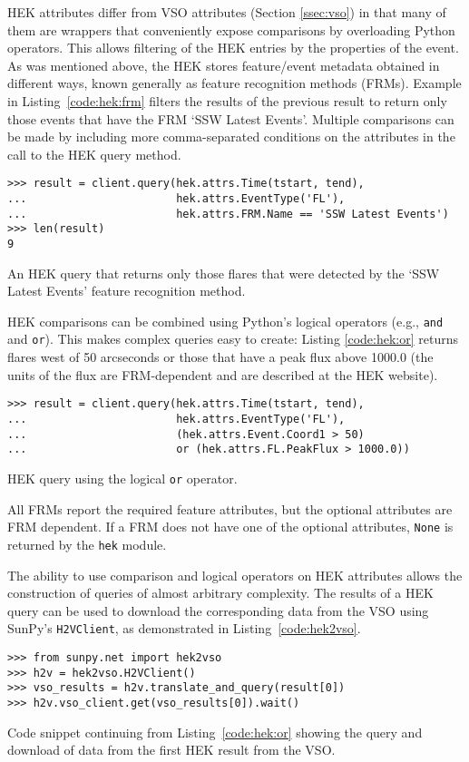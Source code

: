 HEK attributes differ from VSO attributes (Section \ref{ssec:vso}) in that many 
of them are wrappers that conveniently expose comparisons by overloading Python 
operators. This allows filtering of the HEK entries by the properties of the 
event. As was mentioned above, the HEK stores feature/event metadata obtained 
in different ways, known generally as feature recognition methods (FRMs). 
Example in Listing~\ref{code:hek:frm} filters the results of the previous 
result to return only those events that have the FRM `SSW Latest Events'.  Multiple comparisons can be made by including more comma-separated
conditions on the attributes in the call to the HEK query method.

\begin{listing}[H]
\begin{verbatim}
>>> result = client.query(hek.attrs.Time(tstart, tend), 
...                       hek.attrs.EventType('FL'),
...                       hek.attrs.FRM.Name == 'SSW Latest Events')
>>> len(result)
9
\end{verbatim}
\caption{An HEK query that returns only those flares that were
  detected by the `SSW Latest Events' feature recognition method.}
\label{code:hek:frm}
\end{listing}

HEK comparisons can be combined using Python's logical operators (e.g., \texttt{and}
and \texttt{or}). This makes complex queries easy to create: Listing \ref{code:hek:or} 
returns flares west of 50 arcseconds or those that have a peak flux above 
1000.0 (the units of the flux are FRM-dependent and are described at the HEK 
website).
\begin{listing}[H]
\begin{verbatim}
>>> result = client.query(hek.attrs.Time(tstart, tend), 
...                       hek.attrs.EventType('FL'),
...                       (hek.attrs.Event.Coord1 > 50) 
...                       or (hek.attrs.FL.PeakFlux > 1000.0))
\end{verbatim}
\caption{HEK query using the logical \texttt{or} operator.}
\label{code:hek:or}
\end{listing}
All FRMs report the required feature attributes, but the optional attributes 
are FRM dependent.  If a FRM does not have one of the optional attributes, 
\texttt{None} is returned by the \texttt{hek} module. 

The ability to use comparison and logical operators on HEK attributes allows 
the construction of queries of almost arbitrary complexity. 
The results of a HEK query can be used to download the 
corresponding data from the VSO using SunPy's \texttt{H2VClient}, as 
demonstrated in Listing~\ref{code:hek2vso}.
\begin{listing}[H]
\begin{verbatim}
>>> from sunpy.net import hek2vso
>>> h2v = hek2vso.H2VClient()
>>> vso_results = h2v.translate_and_query(result[0])
>>> h2v.vso_client.get(vso_results[0]).wait()
\end{verbatim}
\caption{Code snippet continuing from Listing~\ref{code:hek:or} showing the 
query and download of data from the first HEK result from the VSO.}
\label{code:hek2vso}
\end{listing}
